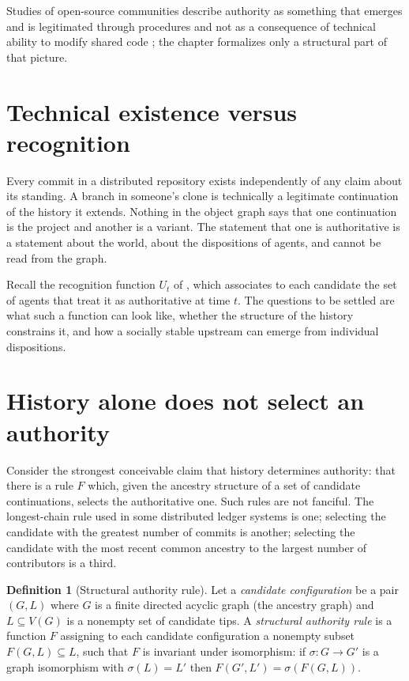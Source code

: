 \documentclass[11pt,twoside,openright]{book}
\theoremstyle{plain}
\theoremstyle{definition}
\newtheorem{definition}[theorem]{Definition}
\theoremstyle{remark}
\begin{document}
Studies of open-source communities describe authority as something that emerges and is legitimated through procedures and not as a consequence of technical ability to modify shared code \cite{omahony2007}; the chapter formalizes only a structural part of that picture.

\section{Technical existence versus recognition}

Every commit in a distributed repository exists independently of any claim about its standing. A branch in someone's clone is technically a legitimate continuation of the history it extends. Nothing in the object graph says that one continuation is the project and another is a variant. The statement that one is authoritative is a statement about the world, about the dispositions of agents, and cannot be read from the graph.

Recall the recognition function $U_t$ of , which associates to each candidate the set of agents that treat it as authoritative at time $t$. The questions to be settled are what such a function can look like, whether the structure of the history constrains it, and how a socially stable upstream can emerge from individual dispositions.

\section{History alone does not select an authority}

Consider the strongest conceivable claim that history determines authority: that there is a rule $F$ which, given the ancestry structure of a set of candidate continuations, selects the authoritative one. Such rules are not fanciful. The longest-chain rule used in some distributed ledger systems is one; selecting the candidate with the greatest number of commits is another; selecting the candidate with the most recent common ancestry to the largest number of contributors is a third.

\begin{definition}[Structural authority rule]\label{def:structrule}
Let a \emph{candidate configuration} be a pair $(G,L)$ where $G$ is a finite directed acyclic graph (the ancestry graph) and $L\subseteq V(G)$ is a nonempty set of candidate tips. A \emph{structural authority rule} is a function $F$ assigning to each candidate configuration a nonempty subset $F(G,L)\subseteq L$, such that $F$ is invariant under isomorphism: if $\sigma:G\to G'$ is a graph isomorphism with $\sigma(L)=L'$ then $F(G',L')=\sigma(F(G,L))$.
\end{definition}
\end{document}
